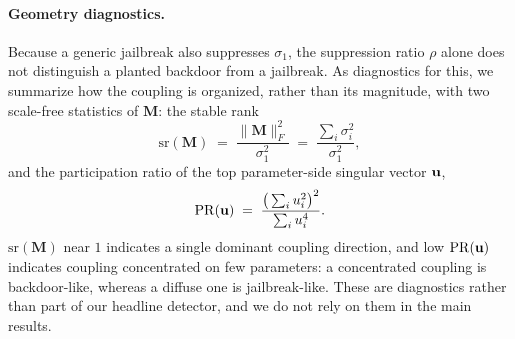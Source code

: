 \paragraph{Geometry diagnostics.}
Because a generic jailbreak also suppresses $\sigma_1$, the suppression ratio $\rho$ alone does not distinguish a planted backdoor from a jailbreak. As diagnostics for this, we summarize how the coupling is organized, rather than its magnitude, with two scale-free statistics of $\mathbf{M}$: the stable rank
\begin{equation}
\label{eq:stablerank}
    \mathrm{sr}(\mathbf{M}) \;=\; \frac{\|\mathbf{M}\|_F^2}{\sigma_1^2}
    \;=\; \frac{\sum_i \sigma_i^2}{\sigma_1^2},
\end{equation}
and the participation ratio of the top parameter-side singular vector $\mathbf{u}$,
\begin{equation}
\label{eq:pr}
    \mathrm{PR}(\mathbf{u}) \;=\; \frac{\big(\sum_i u_i^2\big)^2}{\sum_i u_i^4}.
\end{equation}
$\mathrm{sr}(\mathbf{M})$ near $1$ indicates a single dominant coupling direction, and low $\mathrm{PR}(\mathbf{u})$ indicates coupling concentrated on few parameters: a concentrated coupling is backdoor-like, whereas a diffuse one is jailbreak-like. These are diagnostics rather than part of our headline detector, and we do not rely on them in the main results.
